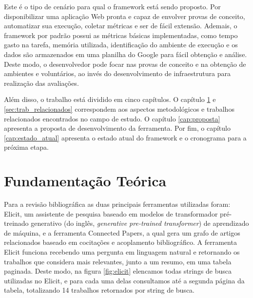 \documentclass[12pt]{tcc}
\begin{document}
Este é o tipo de cenário para qual o framework está sendo proposto.
Por disponibilizar uma aplicação Web pronta e capaz de envolver provas de conceito, automatizar sua execução, coletar métricas e ser de fácil extensão.
Ademais, o framework por padrão possui as métricas básicas implementadas, como tempo gasto na tarefa, memória utilizada, identificação do ambiente de execução e os dados são armazenados em uma planilha do Google para fácil obtenção e análise.
Deste modo, o desenvolvedor pode focar nas provas de conceito e na obtenção de ambientes e voluntários, ao invés do desenvolvimento de infraestrutura para realização das avaliações.

Além disso, o trabalho está dividido em cinco capítulos.
O capítulo \ref{cap:fund_teorica} e \ref{sec:trab_relacionados} correspondem aos aspectos metodológicos e trabalhos relacionados encontrados no campo de estudo.
O capítulo \ref{cap:proposta} apresenta a proposta de desenvolvimento da ferramenta.
Por fim, o capítulo \ref{cap:estado_atual} apresenta o estado atual do framework e o cronograma para a próxima etapa.


\chapter{Fundamentação Teórica}
\label{cap:fund_teorica}

Para a revisão bibliográfica as duas principais ferramentas utilizadas foram: Elicit, um assistente de pesquisa baseado em modelos de transformador pré-treinado generativo (do inglês, \emph{generative pre-trained transformer}) de aprendizado de máquina, e a ferramenta Connected Papers, a qual  gera um grafo de artigos relacionados baseado em cocitações e acoplamento bibliográfico.
A ferramenta Elicit funciona recebendo uma pergunta em linguagem natural e retornando os trabalhos que considera mais relevantes, junto a um resumo, em uma tabela paginada.
Deste modo, na figura \ref{fig:elicit} elencamos todas strings de busca utilizadas no Elicit, e para cada uma delas consultamos até a segunda página da tabela, totalizando 14 trabalhos retornados por string de busca.
\end{document}
